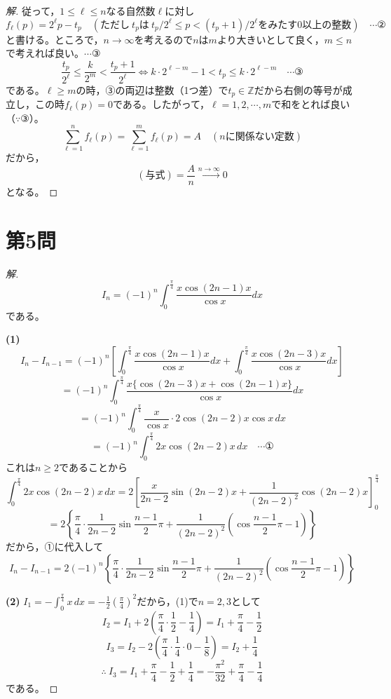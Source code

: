 \documentclass[../main.tex]{subfiles}
\begin{document}
\begin{proof}[解]
  従って，$1\le\ell\le n$なる自然数$\ell$に対し
  \[
    f_\ell(p)=2^\ell p-t_p \quad(\text{ただし}\ t_p\text{は}\ t_p/2^\ell\le p<(t_p+1)/2^\ell\text{をみたす0以上の整数}) \quad\cdots\text{②}
  \]
  と書ける。ところで，$n\to\infty$を考えるので$n$は$m$より大きいとして良く，$m\le n$で考えれば良い。$\cdots$③
  \[
    \frac{t_p}{2^\ell}\le\frac{k}{2^m}<\frac{t_p+1}{2^\ell} \iff k\cdot2^{\ell-m}-1<t_p\le k\cdot2^{\ell-m} \quad\cdots\text{③}
  \]
  である。$\ell\ge m$の時，③の両辺は整数（1つ差）で$t_p\in\mathbb{Z}$だから右側の等号が成立し，この時$f_\ell(p)=0$である。したがって，$\ell=1,2,\cdots,m$で和をとれば良い（$\because$③）。
  \[
    \sum_{\ell=1}^nf_\ell(p)=\sum_{\ell=1}^mf_\ell(p)=A \quad(n\text{に関係ない定数})
  \]
  だから，
  \[
    (\text{与式})=\frac{A}{n}\xrightarrow{n\to\infty}0
  \]
  となる。
\end{proof}

\newpage

\section*{第5問}

\begin{proof}[解]
  \[
    I_n=(-1)^n\int_0^{\frac{\pi}{4}}\frac{x\cos(2n-1)x}{\cos x}dx
  \]
  である。

  \textbf{(1)}
  \[
    I_n-I_{n-1}=(-1)^n\left[\int_0^{\frac{\pi}{4}}\frac{x\cos(2n-1)x}{\cos x}dx+\int_0^{\frac{\pi}{4}}\frac{x\cos(2n-3)x}{\cos x}dx\right]
  \]
  \[
    =(-1)^n\int_0^{\frac{\pi}{4}}\frac{x\{\cos(2n-3)x+\cos(2n-1)x\}}{\cos x}dx
  \]
  \[
    =(-1)^n\int_0^{\frac{\pi}{4}}\frac{x}{\cos x}\cdot2\cos(2n-2)x\cos x\,dx
  \]
  \[
    =(-1)^n\int_0^{\frac{\pi}{4}}2x\cos(2n-2)x\,dx \quad\cdots\text{①}
  \]
  これは$n\ge2$であることから
  \[
    \int_0^{\frac{\pi}{4}}2x\cos(2n-2)x\,dx=2\left[\frac{x}{2n-2}\sin(2n-2)x+\frac{1}{(2n-2)^2}\cos(2n-2)x\right]_0^{\frac{\pi}{4}}
  \]
  \[
    =2\left\{\frac{\pi}{4}\cdot\frac{1}{2n-2}\sin\frac{n-1}{2}\pi+\frac{1}{(2n-2)^2}\left(\cos\frac{n-1}{2}\pi-1\right)\right\}
  \]
  だから，①に代入して
  \[
    I_n-I_{n-1}=2(-1)^n\left\{\frac{\pi}{4}\cdot\frac{1}{2n-2}\sin\frac{n-1}{2}\pi+\frac{1}{(2n-2)^2}\left(\cos\frac{n-1}{2}\pi-1\right)\right\}
  \]

  \textbf{(2)} $I_1=-\displaystyle\int_0^{\frac{\pi}{4}}x\,dx=-\frac12\left(\frac{\pi}{4}\right)^2$だから，(1)で$n=2,3$として
  \[
    I_2=I_1+2\left(\frac{\pi}{4}\cdot\frac12-\frac14\right)=I_1+\frac{\pi}{4}-\frac12
  \]
  \[
    I_3=I_2-2\left(\frac{\pi}{4}\cdot\frac14\cdot0-\frac18\right)=I_2+\frac14
  \]
  \[
    \therefore\ I_3=I_1+\frac{\pi}{4}-\frac12+\frac14=-\frac{\pi^2}{32}+\frac{\pi}{4}-\frac14
  \]
  である。
\end{proof}
\end{document}
